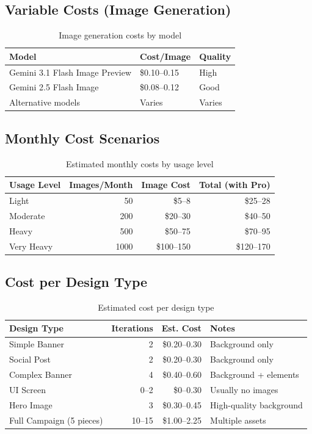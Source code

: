 \documentclass[11pt,a4paper]{article}
\begin{document}
\subsection{Variable Costs (Image Generation)}

\begin{table}[h]
\centering
\begin{tabular}{@{}lll@{}}
\toprule
\textbf{Model} & \textbf{Cost/Image} & \textbf{Quality} \\
\midrule
Gemini 3.1 Flash Image Preview & \$0.10--0.15 & High \\
Gemini 2.5 Flash Image & \$0.08--0.12 & Good \\
Alternative models & Varies & Varies \\
\bottomrule
\end{tabular}
\caption{Image generation costs by model}
\end{table}

\subsection{Monthly Cost Scenarios}

\begin{table}[h]
\centering
\begin{tabular}{@{}lrrr@{}}
\toprule
\textbf{Usage Level} & \textbf{Images/Month} & \textbf{Image Cost} & \textbf{Total (with Pro)} \\
\midrule
Light & 50 & \$5--8 & \$25--28 \\
Moderate & 200 & \$20--30 & \$40--50 \\
Heavy & 500 & \$50--75 & \$70--95 \\
Very Heavy & 1000 & \$100--150 & \$120--170 \\
\bottomrule
\end{tabular}
\caption{Estimated monthly costs by usage level}
\end{table}

\subsection{Cost per Design Type}

\begin{table}[h]
\centering
\begin{tabular}{@{}lrrl@{}}
\toprule
\textbf{Design Type} & \textbf{Iterations} & \textbf{Est. Cost} & \textbf{Notes} \\
\midrule
Simple Banner & 2 & \$0.20--0.30 & Background only \\
Social Post & 2 & \$0.20--0.30 & Background only \\
Complex Banner & 4 & \$0.40--0.60 & Background + elements \\
UI Screen & 0--2 & \$0--0.30 & Usually no images \\
Hero Image & 3 & \$0.30--0.45 & High-quality background \\
Full Campaign (5 pieces) & 10--15 & \$1.00--2.25 & Multiple assets \\
\bottomrule
\end{tabular}
\caption{Estimated cost per design type}
\end{table}
\end{document}
